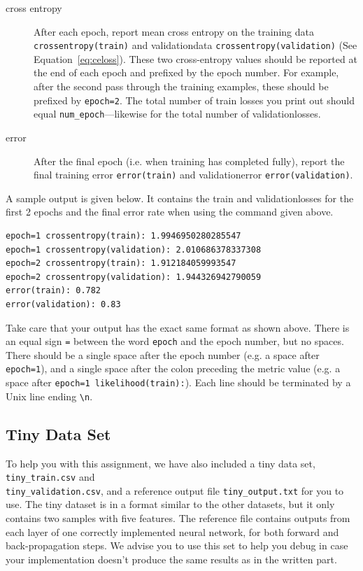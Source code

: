 \documentclass[11pt,addpoints,answers]{exam}
\begin{document}
\begin{description}
\item[cross entropy] After each epoch, report mean cross entropy on the training data \lstinline{crossentropy(train)} and validation\thinspace data \texttt{crossentropy(validation)} (See Equation~\ref{eq:celoss}). These two cross-entropy values should be reported at the end of each epoch and prefixed by the epoch number. For example, after the second pass through the training examples, these should be prefixed by \lstinline{epoch=2}. The total number of train losses you print out should equal \texttt{num\_epoch}---likewise for the total number of validation\thinspace losses.
\item[error] After the final epoch (i.e. when training has completed fully), report the final training error \lstinline{error(train)} and validation\thinspace error \texttt{error(validation)}. 
\end{description}

A sample output is given below. It contains the train and validation\thinspace losses for the first 2 epochs and the final error rate when using the command given above.

\begin{lstlisting}
epoch=1 crossentropy(train): 1.9946950280285547
epoch=1 crossentropy(validation): 2.010686378337308
epoch=2 crossentropy(train): 1.912184059993547
epoch=2 crossentropy(validation): 1.944326942790059
error(train): 0.782
error(validation): 0.83
\end{lstlisting}

Take care that your output has the exact same format as shown above. There is an equal sign \lstinline{=} between the word \lstinline{epoch} and the epoch number, but no spaces. There should be a single space after the epoch number (e.g. a space after \lstinline{epoch=1}), and a single space after the colon preceding the metric value (e.g. a space after \lstinline{epoch=1 likelihood(train):}). Each line should be terminated by a Unix line ending \lstinline{\n}.

\subsection{Tiny Data Set} \label{tiny}
To help you with this assignment, we have also included a tiny data set, \texttt{tiny\_train.csv} and\\ \texttt{tiny\_validation.csv}, and a reference output file \texttt{tiny\_output.txt} for you to use. The tiny dataset is in a format similar to the other datasets, but it only contains two samples with five features. The reference file contains outputs from each layer of one correctly implemented neural network, for both forward and back-propagation steps. We advise you to use this set to help you debug in case your implementation doesn't produce the same results as in the written part.
\end{document}
